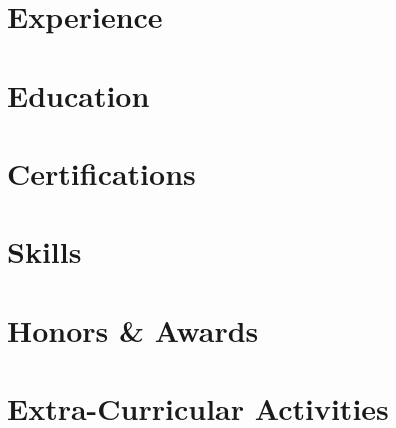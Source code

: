 \documentclass[letter,10pt]{article}
\begin{document}
\thispagestyle{firstpage}




\section{Experience}


\thispagestyle{default}
\setlength{\headheight}{0.55in}
\setlength{\headsep}{0pt}

\section{Education}


\section{Certifications}

% 

\section{Skills}


\section{Honors \& Awards}


\section{Extra-Curricular Activities}

\end{document}
